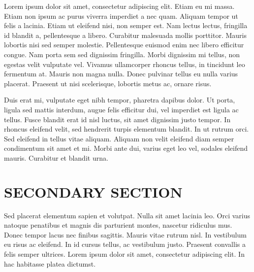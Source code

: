 \documentclass[
  12pt,
  a4paper,
  oneside]{tesesusp}
\begin{document}
\vspace{10pt}

Lorem ipsum dolor sit amet, consectetur adipiscing elit. Etiam eu mi
massa. Etiam non ipsum ac purus viverra imperdiet a nec quam. Aliquam
tempor ut felis a lacinia. Etiam ut eleifend nisi, non semper est. Nam
lectus lectus, fringilla id blandit a, pellentesque a libero. Curabitur
malesuada mollis porttitor. Mauris lobortis nisi sed semper molestie.
Pellentesque euismod enim nec libero efficitur congue. Nam porta sem sed
dignissim fringilla. Morbi dignissim mi tellus, non egestas velit
vulputate vel. Vivamus ullamcorper rhoncus tellus, in tincidunt leo
fermentum at. Mauris non magna nulla. Donec pulvinar tellus eu nulla
varius placerat. Praesent ut nisi scelerisque, lobortis metus ac, ornare
risus.

Duis erat mi, vulputate eget nibh tempor, pharetra dapibus dolor. Ut
porta, ligula sed mattis interdum, augue felis efficitur dui, vel
imperdiet est ligula ac tellus. Fusce blandit erat id nisl luctus, sit
amet dignissim justo tempor. In rhoncus eleifend velit, sed hendrerit
turpis elementum blandit. In ut rutrum orci. Sed eleifend in tellus
vitae aliquam. Aliquam non velit eleifend diam semper condimentum sit
amet et mi. Morbi ante dui, varius eget leo vel, sodales eleifend
mauris. Curabitur et blandit urna.

\hypertarget{secondary-section-3}{%
\section{SECONDARY SECTION}\label{secondary-section-3}}

Sed placerat elementum sapien et volutpat. Nulla sit amet lacinia leo.
Orci varius natoque penatibus et magnis dis parturient montes, nascetur
ridiculus mus. Donec tempor lacus nec finibus sagittis. Mauris vitae
rutrum nisl. In vestibulum eu risus ac eleifend. In id cursus tellus, ac
vestibulum justo. Praesent convallis a felis semper ultrices. Lorem
ipsum dolor sit amet, consectetur adipiscing elit. In hac habitasse
platea dictumst.
\end{document}
